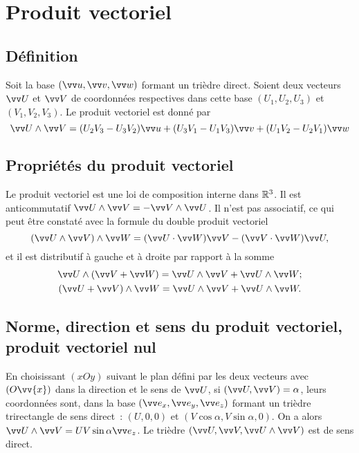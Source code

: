 \section{Produit vectoriel}
\label{chap1-sec:produitvectoriel}

\subsection{Définition}
\label{chap1-subsec:defprodvec}

Soit la base \((\vu,\vvv,\vw)\) formant un trièdre direct. Soient deux vecteurs \(\vU\) et \(\vV\) de coordonnées respectives dans cette base \((U_1,U_2,U_3)\) et \((V_1,V_2,V_3)\). Le produit vectoriel est donné par
\begin{equation}
  \vU \wedge \vV = (U_2V_3-U_3V_2) \vu + (U_3V_1-U_1V_3) \vvv + (U_1V_2-U_2V_1) \vw
\end{equation}

\subsection{Propriétés du produit vectoriel}
\label{chap1-subsec:propprodvec}

Le produit vectoriel est une loi de composition interne dans \(\mathbb{R}^3\). Il est anticommutatif \(\vU\wedge\vV=-\vV\wedge\vU\). Il n'est pas associatif, ce qui peut être constaté avec la formule du double produit vectoriel
\begin{equation}
  \label{eq:doubleproduitvectoriel}
  (\vU\wedge\vV)\wedge\vW=(\vU\cdot\vW)\vV-(\vV\cdot\vW)\vU,
\end{equation}
et il est distributif à gauche et à droite par rapport à la somme
\begin{gather}
  \vU\wedge(\vV+\vW)= \vU\wedge\vV + \vU\wedge\vW;\\
  (\vU+\vV)\wedge\vW = \vU\wedge\vV + \vU\wedge\vW.
\end{gather}

\subsection{Norme, direction et sens du produit vectoriel, produit vectoriel nul}
\label{chap1-sec:normedirectionetsensproduitvectoriel}

En choisissant \((xOy)\) suivant le plan défini par les deux vecteurs avec \((O\vv{x})\) dans la direction et le sens de \(\vU\), si \((\vU,\vV)=\alpha\), leurs coordonnées sont, dans la base \((\ex,\ey,\ez)\) formant un trièdre trirectangle de sens direct~: \((U,0,0)\) et \((V\cos\alpha,V\sin\alpha,0)\). On a alors \(\vU\wedge\vV = UV\sin\alpha\ez\). Le trièdre \((\vU,\vV,\vU\wedge\vV)\) est de sens direct.

